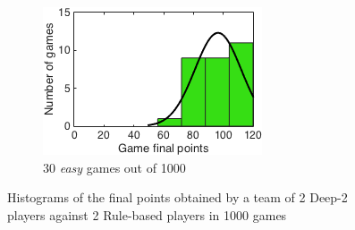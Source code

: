\begin{figure}[h]
\begin{subfigure}[h]{0.32\textwidth}
                \includegraphics[width=\textwidth]{./img/appendix/histIeasy}
                \caption{30 \emph{easy} games out of 1000}
                \label{app:histIeasy}
        \end{subfigure}
        \caption[Histograms of the final points obtained in scenario (i) for \emph{hard}, \emph{medium} and \emph{easy} hands]{Histograms of the final points obtained by a team of 2 Deep-2 players against 2 Rule-based players in 1000 games}
        \label{app:histogramsI}
\end{figure}

